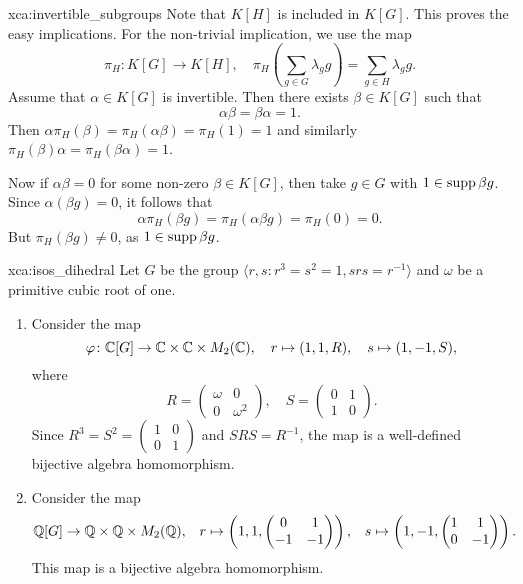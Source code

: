 \begin{sol}{xca:invertible_subgroups}
Note that $K[H]$ is included in $K[G]$. This proves the easy implications. For the non-trivial implication, we use the map 
\[ 
\pi_H\colon K[G]\to K[H],\quad \pi_H\left(\sum_{g\in G}\lambda_gg\right)=\sum_{g\in H}\lambda_gg.
\] 
Assume that $\alpha\in K[G]$ is invertible. Then there exists $\beta\in K[G]$ such that \[ 
\alpha\beta=\beta\alpha=1.
\]
Then $\alpha\pi_H(\beta)=\pi_H(\alpha\beta)=\pi_H(1)=1$ and similarly $\pi_H(\beta)\alpha=\pi_H(\beta\alpha)=1$. 

Now if $\alpha\beta=0$ for some non-zero $\beta\in K[G]$, then take $g\in G$ with $1\in\operatorname{supp} \beta g$. Since $\alpha(\beta g)=0$, it follows that 
\[ 
\alpha\pi_H(\beta g)=\pi_H(\alpha\beta g)=\pi_H(0)=0. 
\]
But $\pi_H(\beta g)\ne 0$, as $1\in\operatorname{supp}\beta g$. 
\end{sol}

\begin{sol}{xca:isos_dihedral}
Let $G$ be the group $\langle r,s:r^3=s^2=1,srs=r^{-1}\rangle$ 
and $\omega$ be a primitive cubic root of one. 
\begin{enumerate}
    \item Consider the map 
\[
\varphi\colon \mathbb{C}[G]\to \mathbb{C}\times \mathbb{C}\times M_2(\mathbb{C}),\quad 
r\mapsto (1,1,R),\quad 
s\mapsto (1,-1,S),
\]
where 
\[
R=\begin{pmatrix}
    \omega & 0\\
    0 & \omega^2
\end{pmatrix},\quad 
S=\begin{pmatrix}
    0 & 1 \\
    1 & 0
    \end{pmatrix}. 
\] 
Since $R^3=S^2=\begin{pmatrix}1&0\\0&1\end{pmatrix}$ and $SRS=R^{-1}$, the map 
is a well-defined bijective algebra homomorphism. 
\item Consider the map 
\begin{align*} 
\mathbb{Q}[G]\to\mathbb{Q}\times\mathbb{Q}\times M_2(\mathbb{Q}),&&
r\mapsto \left(1,1,\begin{pmatrix}0&1\\-1&-1\end{pmatrix}\right),&&
s\mapsto \left(1,-1,\begin{pmatrix}1&1\\0&-1\end{pmatrix}\right). 
\end{align*}
This map is a bijective algebra homomorphism. 
\end{enumerate}
\end{sol}


